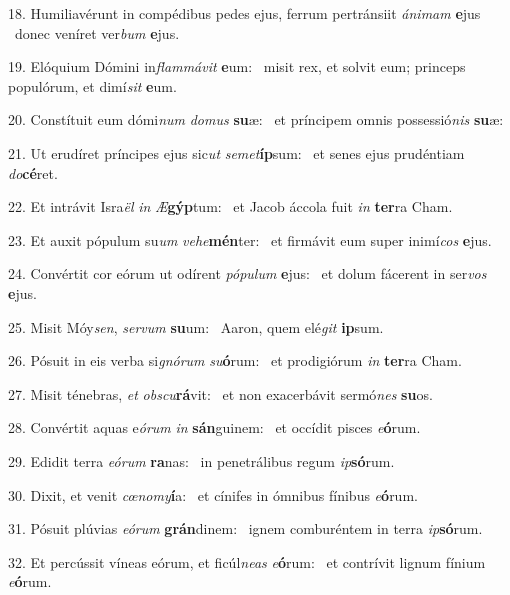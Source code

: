 18. Humiliavérunt in compédibus pedes ejus, ferrum pertránsiit \textit{á}\textit{ni}\textit{mam} \textbf{e}jus \ast\  donec veníret ver\textit{bum} \textbf{e}jus.\

19. Elóquium Dómini in\textit{flam}\textit{má}\textit{vit} \textbf{e}um: \ast\  misit rex, et solvit eum; princeps populórum, et dimí\textit{sit} \textbf{e}um.\

20. Constítuit eum dómi\textit{num} \textit{do}\textit{mus} \textbf{su}æ: \ast\  et príncipem omnis possessió\textit{nis} \textbf{su}æ:\

21. Ut erudíret príncipes ejus sic\textit{ut} \textit{se}\textit{met}\textbf{íp}sum: \ast\  et senes ejus prudéntiam \textit{do}\textbf{cé}ret.\

22. Et intrávit Isra\textit{ël} \textit{in} \textit{Æ}\textbf{gýp}tum: \ast\  et Jacob áccola fuit \textit{in} \textbf{ter}ra Cham.\

23. Et auxit pópulum su\textit{um} \textit{ve}\textit{he}\textbf{mén}ter: \ast\  et firmávit eum super inimí\textit{cos} \textbf{e}jus.\

24. Convértit cor eórum ut odírent \textit{pó}\textit{pu}\textit{lum} \textbf{e}jus: \ast\  et dolum fácerent in ser\textit{vos} \textbf{e}jus.\

25. Misit Móy\textit{sen}, \textit{ser}\textit{vum} \textbf{su}um: \ast\  Aaron, quem elé\textit{git} \textbf{ip}sum.\

26. Pósuit in eis verba si\textit{gnó}\textit{rum} \textit{su}\textbf{ó}rum: \ast\  et prodigiórum \textit{in} \textbf{ter}ra Cham.\

27. Misit ténebras, \textit{et} \textit{obs}\textit{cu}\textbf{rá}vit: \ast\  et non exacerbávit sermó\textit{nes} \textbf{su}os.\

28. Convértit aquas e\textit{ó}\textit{rum} \textit{in} \textbf{sán}guinem: \ast\  et occídit pisces \textit{e}\textbf{ó}rum.\

29. Edidit terra \textit{e}\textit{ó}\textit{rum} \textbf{ra}nas: \ast\  in penetrálibus regum \textit{ip}\textbf{só}rum.\

30. Dixit, et venit \textit{cœ}\textit{no}\textit{my}\textbf{í}a: \ast\  et cínifes in ómnibus fínibus \textit{e}\textbf{ó}rum.\

31. Pósuit plúvias \textit{e}\textit{ó}\textit{rum} \textbf{grán}dinem: \ast\  ignem comburéntem in terra \textit{ip}\textbf{só}rum.\

32. Et percússit víneas eórum, et ficúl\textit{ne}\textit{as} \textit{e}\textbf{ó}rum: \ast\  et contrívit lignum fínium \textit{e}\textbf{ó}rum.\

